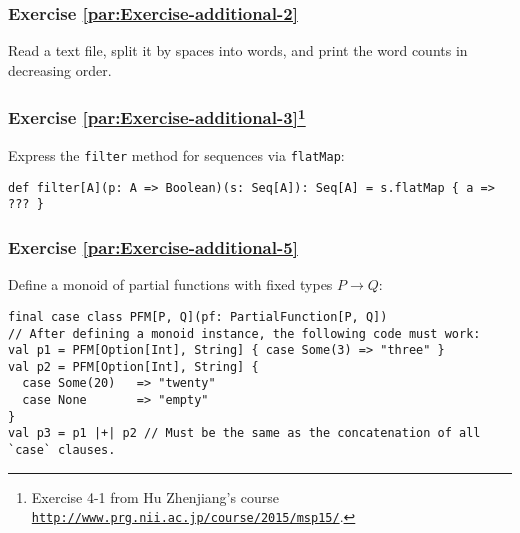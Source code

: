 \subsubsection{Exercise \label{par:Exercise-additional-2}\ref{par:Exercise-additional-2}}

Read a text file, split it by spaces into words, and print the word
counts in decreasing order.%
\begin{comment}
\begin{enumerate}
\item FPIS exercise 2.2: Check whether a sequence \lstinline!Seq[A]! is
sorted according to a given ordering function of type \lstinline!(A, A) => Boolean!.
\item FPIS exercise 3.24: Implement a function \lstinline!hasSubsequence!
that checks whether a \lstinline!List! contains another \lstinline!List!
as a subsequence. For instance, \lstinline!List(1,2,3,4)! would have
\lstinline!List(1,2)!, \lstinline!List(2,3)!, and \lstinline!List(4)!
as subsequences, among others. (Dynamic programming?)
\end{enumerate}
\end{comment}


\subsubsection{Exercise \label{par:Exercise-additional-3}\ref{par:Exercise-additional-3}\protect\footnote{Exercise 4-1 from Hu Zhenjiang\textsf{'}s course \texttt{\protect\href{http://www.prg.nii.ac.jp/course/2015/msp15/}{http://www.prg.nii.ac.jp/course/2015/msp15/}}.}}

Express the \lstinline!filter! method for sequences via \lstinline!flatMap!:
\begin{lstlisting}
def filter[A](p: A => Boolean)(s: Seq[A]): Seq[A] = s.flatMap { a => ??? }
\end{lstlisting}


\subsubsection{Exercise \label{par:Exercise-additional-5}\ref{par:Exercise-additional-5}}

Define a monoid of partial functions with fixed types $P\rightarrow Q$:
\begin{lstlisting}
final case class PFM[P, Q](pf: PartialFunction[P, Q])
// After defining a monoid instance, the following code must work:
val p1 = PFM[Option[Int], String] { case Some(3) => "three" }
val p2 = PFM[Option[Int], String] {
  case Some(20)   => "twenty"
  case None       => "empty"
}
val p3 = p1 |+| p2 // Must be the same as the concatenation of all `case` clauses.
\end{lstlisting}


